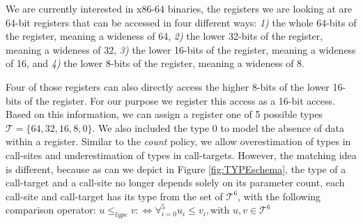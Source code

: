 %
%
%

We are currently interested in x86-64 binaries, the registers we are looking at are 64-bit registers that can be accessed in four different ways:
\textit{1)} the whole 64-bits of the register, meaning a wideness of 64,
\textit{2)} the lower 32-bits of the register, meaning a wideness of 32,
\textit{3)} the lower 16-bits of the register, meaning a wideness of 16, and
\textit{4)} the lower 8-bits of the register, meaning a wideness of 8.

Four of those registers can also directly access the higher 8-bits of the lower 16-bits of the register. For our purpose we register this access as a 16-bit access. 
Based on this information,
we can assign a register one of 5 possible types $\mathcal{T} = \{64, 32, 16, 8, 0\}$. We also included the type 0 to model the absence of data within a register. 
Similar to the \emph{count} policy, we allow overestimation of types in call-sites and underestimation of types in call-targets. However, the matching idea is different, 
because as can we depict in Figure \ref{fig:TYPEschema}, the type of a call-target and a call-site no longer depends solely on its parameter count, 
each call-site and call-target has its type from the set of $\mathcal{T}^6$, with the following comparison operator:
$
	u \leq_{type} v :\Longleftrightarrow  
	\forall_{i = 0}^{5} {u_i \leq v_i} , \text {with } u, v \in \mathcal{T}^6
$

